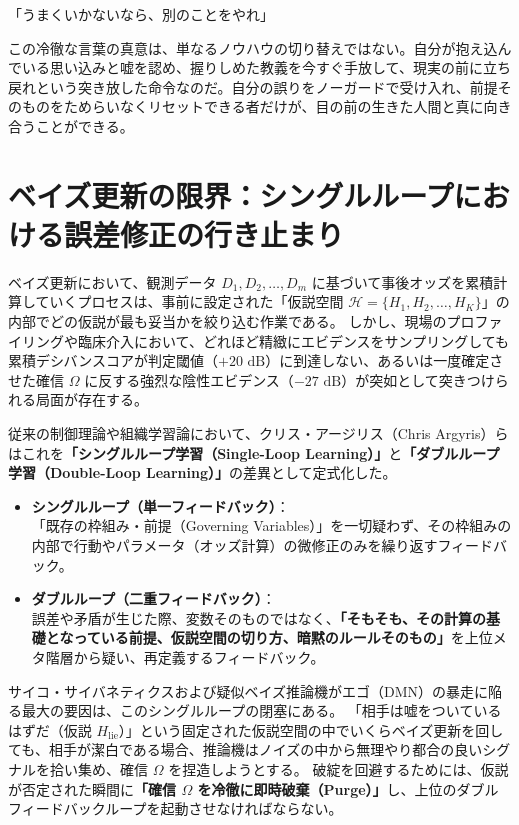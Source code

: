 「うまくいかないなら、別のことをやれ」

この冷徹な言葉の真意は、単なるノウハウの切り替えではない。自分が抱え込んでいる思い込みと嘘を認め、握りしめた教義を今すぐ手放して、現実の前に立ち戻れという突き放した命令なのだ。自分の誤りをノーガードで受け入れ、前提そのものをためらいなくリセットできる者だけが、目の前の生きた人間と真に向き合うことができる。

\section{ベイズ更新の限界：シングルループにおける誤差修正の行き止まり}

ベイズ更新において、観測データ $D_1, D_2, \dots, D_m$ に基づいて事後オッズを累積計算していくプロセスは、事前に設定された「仮説空間 $\mathcal{H} = \{H_1, H_2, \dots, H_K\}$」の内部でどの仮説が最も妥当かを絞り込む作業である。
しかし、現場のプロファイリングや臨床介入において、どれほど精緻にエビデンスをサンプリングしても累積デシバンスコアが判定閾値（$+20\text{ dB}$）に到達しない、あるいは一度確定させた確信 $\Omega$ に反する強烈な陰性エビデンス（$-27\text{ dB}$）が突如として突きつけられる局面が存在する。

従来の制御理論や組織学習論において、クリス・アージリス（Chris Argyris）らはこれを\textbf{「シングルループ学習（Single-Loop Learning）」}と\textbf{「ダブルループ学習（Double-Loop Learning）」}の差異として定式化した。

\begin{itemize}
  \item \textbf{シングルループ（単一フィードバック）}：\\
  「既存の枠組み・前提（Governing Variables）」を一切疑わず、その枠組みの内部で行動やパラメータ（オッズ計算）の微修正のみを繰り返すフィードバック。
  \item \textbf{ダブルループ（二重フィードバック）}：\\
  誤差や矛盾が生じた際、変数そのものではなく、\textbf{「そもそも、その計算の基礎となっている前提、仮説空間の切り方、暗黙のルールそのもの」}を上位メタ階層から疑い、再定義するフィードバック。
\end{itemize}

サイコ・サイバネティクスおよび疑似ベイズ推論機がエゴ（DMN）の暴走に陥る最大の要因は、このシングルループの閉塞にある。
「相手は嘘をついているはずだ（仮説 $H_{\mathrm{lie}}$）」という固定された仮説空間の中でいくらベイズ更新を回しても、相手が潔白である場合、推論機はノイズの中から無理やり都合の良いシグナルを拾い集め、確信 $\Omega$ を捏造しようとする。
破綻を回避するためには、仮説が否定された瞬間に\textbf{「確信 $\Omega$ を冷徹に即時破棄（Purge）」}し、上位のダブルフィードバックループを起動させなければならない。

